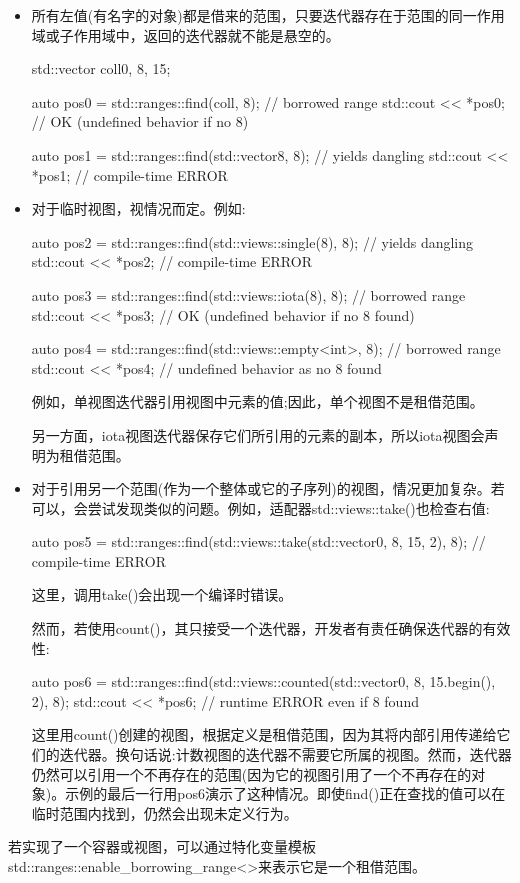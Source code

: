 \begin{itemize}
\item
所有左值(有名字的对象)都是借来的范围，只要迭代器存在于范围的同一作用域或子作用域中，返回的迭代器就不能是悬空的。

\begin{cpp}
std::vector coll{0, 8, 15};

auto pos0 = std::ranges::find(coll, 8); // borrowed range
std::cout << *pos0; // OK (undefined behavior if no 8)

auto pos1 = std::ranges::find(std::vector{8}, 8); // yields dangling
std::cout << *pos1; // compile-time ERROR
\end{cpp}

\item
对于临时视图，视情况而定。例如:

\begin{cpp}
auto pos2 = std::ranges::find(std::views::single(8), 8); // yields dangling
std::cout << *pos2; // compile-time ERROR

auto pos3 = std::ranges::find(std::views::iota(8), 8); // borrowed range
std::cout << *pos3; // OK (undefined behavior if no 8 found)

auto pos4 = std::ranges::find(std::views::empty<int>, 8); // borrowed range
std::cout << *pos4; // undefined behavior as no 8 found
\end{cpp}

例如，单视图迭代器引用视图中元素的值;因此，单个视图不是租借范围。

另一方面，iota视图迭代器保存它们所引用的元素的副本，所以iota视图会声明为租借范围。

\item
对于引用另一个范围(作为一个整体或它的子序列)的视图，情况更加复杂。若可以，会尝试发现类似的问题。例如，适配器std::views::take()也检查右值:

\begin{cpp}
auto pos5 = std::ranges::find(std::views::take(std::vector{0, 8, 15}, 2), 8);
// compile-time ERROR
\end{cpp}

这里，调用take()会出现一个编译时错误。

然而，若使用count()，其只接受一个迭代器，开发者有责任确保迭代器的有效性:

\begin{cpp}
auto pos6 = std::ranges::find(std::views::counted(std::vector{0, 8, 15}.begin(),
							2), 8);
std::cout << *pos6; // runtime ERROR even if 8 found
\end{cpp}

这里用count()创建的视图，根据定义是租借范围，因为其将内部引用传递给它们的迭代器。换句话说:计数视图的迭代器不需要它所属的视图。然而，迭代器仍然可以引用一个不再存在的范围(因为它的视图引用了一个不再存在的对象)。示例的最后一行用pos6演示了这种情况。即使find()正在查找的值可以在临时范围内找到，仍然会出现未定义行为。

\end{itemize}

若实现了一个容器或视图，可以通过特化变量模板std::ranges::enable\_borrowing\_range<>来表示它是一个租借范围。








